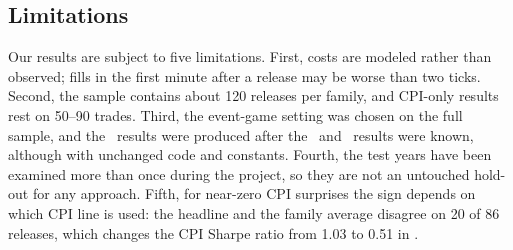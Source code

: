 \subsection{Limitations}

Our results are subject to five limitations. First, costs are modeled rather than observed; fills
in the first minute after a release may be worse than two ticks. Second, the sample contains about
120 releases per family, and CPI-only results rest on 50--90 trades. Third, the event-game setting was
chosen on the full sample, and the \YM\ results were produced after the \ES\ and \NQ\ results were
known, although with unchanged code and constants. Fourth, the test years have been examined more than once during the
project, so they are not an untouched hold-out for any approach. Fifth, for near-zero CPI surprises
the sign depends on which CPI line is used: the headline and the family average disagree on 20 of
86 releases, which changes the CPI Sharpe ratio from 1.03 to 0.51 in \ES.
